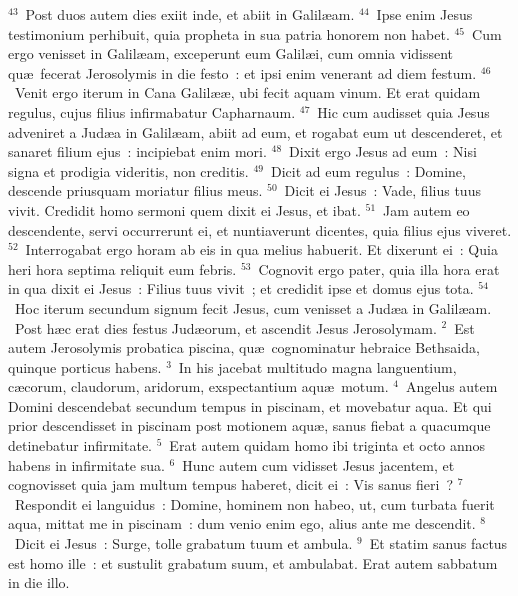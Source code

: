 ${}^{43}$~Post duos autem dies exiit inde, et abiit in Galil\ae am.
${}^{44}$~Ipse enim Jesus testimonium perhibuit, quia propheta in sua patria honorem non habet.
${}^{45}$~Cum ergo venisset in Galil\ae am, exceperunt eum Galil\ae i, cum omnia vidissent qu\ae\ fecerat Jerosolymis in die festo~: et ipsi enim venerant ad diem festum.
${}^{46}$~Venit ergo iterum in Cana Galil\ae \ae , ubi fecit aquam vinum. Et erat quidam regulus, cujus filius infirmabatur Capharnaum.
${}^{47}$~Hic cum audisset quia Jesus adveniret a Jud\ae a in Galil\ae am, abiit ad eum, et rogabat eum ut descenderet, et sanaret filium ejus~: incipiebat enim mori.
${}^{48}$~Dixit ergo Jesus ad eum~: Nisi signa et prodigia videritis, non creditis.
${}^{49}$~Dicit ad eum regulus~: Domine, descende priusquam moriatur filius meus.
${}^{50}$~Dicit ei Jesus~: Vade, filius tuus vivit. Credidit homo sermoni quem dixit ei Jesus, et ibat.
${}^{51}$~Jam autem eo descendente, servi occurrerunt ei, et nuntiaverunt dicentes, quia filius ejus viveret.
${}^{52}$~Interrogabat ergo horam ab eis in qua melius habuerit. Et dixerunt ei~: Quia heri hora septima reliquit eum febris.
${}^{53}$~Cognovit ergo pater, quia illa hora erat in qua dixit ei Jesus~: Filius tuus vivit~; et credidit ipse et domus ejus tota.
${}^{54}$~Hoc iterum secundum signum fecit Jesus, cum venisset a Jud\ae a in Galil\ae am.
~\lettrine[lines=10,image=true,loversize=0.05,lraise=-0.03]{P}{}ost h\ae c erat dies festus Jud\ae orum, et ascendit Jesus Jerosolymam.
${}^{2}$~Est autem Jerosolymis probatica piscina, qu\ae\ cognominatur hebraice Bethsaida, quinque porticus habens.
${}^{3}$~In his jacebat multitudo magna languentium, c\ae corum, claudorum, aridorum, exspectantium aqu\ae\ motum.
${}^{4}$~Angelus autem Domini descendebat secundum tempus in piscinam, et movebatur aqua. Et qui prior descendisset in piscinam post motionem aqu\ae , sanus fiebat a quacumque detinebatur infirmitate.
${}^{5}$~Erat autem quidam homo ibi triginta et octo annos habens in infirmitate sua.
${}^{6}$~Hunc autem cum vidisset Jesus jacentem, et cognovisset quia jam multum tempus haberet, dicit ei~: Vis sanus fieri~?
${}^{7}$~Respondit ei languidus~: Domine, hominem non habeo, ut, cum turbata fuerit aqua, mittat me in piscinam~: dum venio enim ego, alius ante me descendit.
${}^{8}$~Dicit ei Jesus~: Surge, tolle grabatum tuum et ambula.
${}^{9}$~Et statim sanus factus est homo ille~: et sustulit grabatum suum, et ambulabat. Erat autem sabbatum in die illo.


